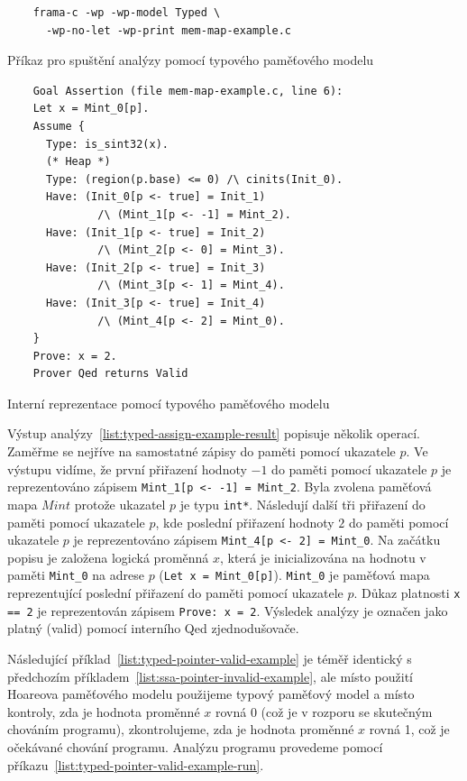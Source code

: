 \begin{listing}[H]
    \begin{verbatim}
    frama-c -wp -wp-model Typed \
      -wp-no-let -wp-print mem-map-example.c
    \end{verbatim}
    \caption{Příkaz pro spuštění analýzy pomocí typového paměťového modelu}
    \label{list:typed-assign-example-run}
\end{listing}

\begin{listing}[H]
    \begin{verbatim}
    Goal Assertion (file mem-map-example.c, line 6):
    Let x = Mint_0[p].
    Assume {
      Type: is_sint32(x).
      (* Heap *)
      Type: (region(p.base) <= 0) /\ cinits(Init_0).
      Have: (Init_0[p <- true] = Init_1)
              /\ (Mint_1[p <- -1] = Mint_2).
      Have: (Init_1[p <- true] = Init_2)
              /\ (Mint_2[p <- 0] = Mint_3).
      Have: (Init_2[p <- true] = Init_3)
              /\ (Mint_3[p <- 1] = Mint_4).
      Have: (Init_3[p <- true] = Init_4)
              /\ (Mint_4[p <- 2] = Mint_0).
    }
    Prove: x = 2.
    Prover Qed returns Valid
    \end{verbatim}
    \caption{Interní reprezentace pomocí typového paměťového modelu}
    \label{list:typed-assign-example-result}
\end{listing}

Výstup analýzy~\ref{list:typed-assign-example-result} popisuje několik operací.
Zaměřme se nejříve na samostatné zápisy do paměti pomocí ukazatele $p$.
Ve výstupu vidíme, že první přiřazení hodnoty $-1$ do paměti pomocí ukazatele $p$
je reprezentováno zápisem \texttt{Mint\_1[p <- -1] = Mint\_2}.
Byla zvolena paměťová mapa $Mint$ protože ukazatel $p$ je typu \texttt{int*}.
Následují další tři přiřazení do paměti pomocí ukazatele $p$,
kde poslední přiřazení hodnoty $2$ do paměti pomocí ukazatele $p$ je reprezentováno zápisem
\texttt{Mint\_4[p <- 2] = Mint\_0}.
Na začátku popisu je založena logická proměnná $x$,
která je inicializována na hodnotu v paměti \texttt{Mint\_0} na adrese $p$ (\texttt{Let x = Mint\_0[p]}).
\texttt{Mint\_0} je paměťová mapa reprezentující poslední přiřazení do paměti pomocí ukazatele $p$.
Důkaz platnosti \texttt{x == 2} je reprezentován zápisem \texttt{Prove: x = 2}.
Výsledek analýzy je označen jako platný (valid) pomocí interního Qed zjednodušovače.

Následující příklad~\ref{list:typed-pointer-valid-example} je téměř identický
s předchozím příkladem~\ref{list:ssa-pointer-invalid-example},
ale místo použití Hoareova paměťového modelu použijeme typový paměťový model
a místo kontroly, zda je hodnota proměnné $x$ rovná 0 (což je v rozporu se skutečným chováním programu),
zkontrolujeme, zda je hodnota proměnné $x$ rovná 1, což je očekávané chování programu.
Analýzu programu provedeme pomocí příkazu~\ref{list:typed-pointer-valid-example-run}.

